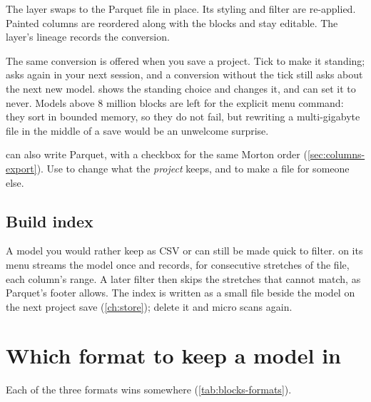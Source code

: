 The layer swaps to the Parquet file in place. Its styling and filter are re-applied. Painted columns are reordered along with the blocks and stay editable. The layer's lineage records the conversion.

The same conversion is offered when you save a project. Tick  to make it standing;  asks again in your next session, and a conversion without the tick still asks about the next new model.  shows the standing choice and changes it, and  can set it to never. Models above 8 million blocks are left for the explicit menu command: they sort in bounded memory, so they do not fail, but rewriting a multi-gigabyte file in the middle of a save would be an unwelcome surprise.

\begin{note}
 can also write Parquet, with a  checkbox for the same Morton order (\cref{sec:columns-export}). Use  to change what the \emph{project} keeps, and  to make a file for someone else.
\end{note}

\subsection{Build index}

A model you would rather keep as CSV or  can still be made quick to filter.  on its menu streams the model once and records, for consecutive stretches of the file, each column's range. A later filter then skips the stretches that cannot match, as Parquet's footer allows. The index is written as a small file beside the model on the next project save (\cref{ch:store}); delete it and micro scans again.

\section{Which format to keep a model in}\label{sec:blocks-which}

Each of the three formats wins somewhere (\cref{tab:blocks-formats}).

